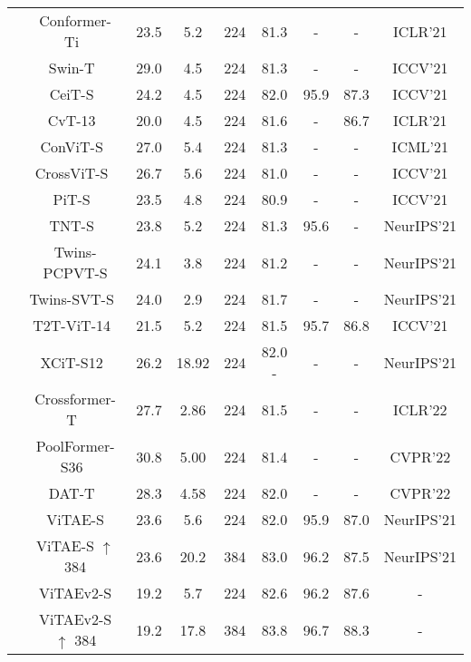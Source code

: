 \documentclass[twocolumn]{svjour3}          \smartqed  \usepackage{natbib}
\begin{document}
\begin{table*}[htbp]
{\begin{tabular}{c|c|ccc|cc|c|c}
          & Conformer-Ti~\citep{peng2021conformer} & 23.5  & 5.2   & 224   & 81.3  & - & - & ICLR'21\\
          & Swin-T~\citep{liu2021swin} & 29.0  & 4.5   & 224   & 81.3  & -     & - & ICCV'21 \\
          & CeiT-S~\citep{yuan2021incorporating} & 24.2  & 4.5   & 224   & 82.0  & 95.9  & 87.3 & ICCV'21 \\
          & CvT-13~\citep{wu2021cvt} & 20.0  & 4.5   & 224   & 81.6  & -     & 86.7 & ICLR'21 \\
          & ConViT-S~\citep{d2021convit} & 27.0  & 5.4  & 224   & 81.3  & -     & - & ICML'21 \\
          & CrossViT-S~\citep{chen2021crossvit} & 26.7  & 5.6  & 224   & 81.0  & -     & - & ICCV'21 \\
          & PiT-S~\citep{heo2021rethinking} & 23.5  & 4.8   & 224   & 80.9  & -     & - & ICCV'21 \\
          & TNT-S~\citep{han2021transformer} & 23.8  & 5.2  & 224   & 81.3  & 95.6  & - & NeurIPS'21 \\
          & Twins-PCPVT-S\citep{chu2021twins} & 24.1  & 3.8  & 224   & 81.2  & -  & - & NeurIPS'21 \\
          & Twins-SVT-S~\citep{chu2021twins} & 24.0 & 2.9 & 224 & 81.7 & - & - & NeurIPS'21 \\
          & T2T-ViT-14~\citep{yuan2021tokens} & 21.5  & 5.2   & 224   & 81.5  & 95.7  & 86.8 & ICCV'21 \\
          & XCiT-S12~\citep{el2021xcit} & 26.2 & 18.92 & 224 & 82.0 - & - & - & NeurIPS'21 \\
          & Crossformer-T~\citep{wang2021crossformer} & 27.7 & 2.86 & 224 & 81.5 & - & - & ICLR'22 \\
          & PoolFormer-S36~\citep{yu2022metaformer} &  30.8 & 5.00 & 224 & 81.4 & - & - & CVPR'22 \\
          & DAT-T~\citep{xia2022vision} &  28.3 & 4.58 & 224 & 82.0 & - & - &  CVPR'22 \\
          & ViTAE-S & 23.6  & 5.6   & 224   & 82.0  & 95.9  & 87.0 & NeurIPS'21 \\
          & {ViTAE-S $\uparrow$ 384} & 23.6   & 20.2   & 384   & 83.0  &  96.2  & 87.5 & NeurIPS'21 \\
          & {ViTAEv2-S} &  19.2  &  5.7 &  224 &    82.6    & 96.2  & 87.6 & - \\
          & {ViTAEv2-S $\uparrow$ 384} &  19.2  &  17.8  &  384 &    83.8    & 96.7  & 88.3 & - \\
    \hline
    \end{tabular}}
  \label{tab:ViTAESuppSota}\end{table*}
\end{document}
